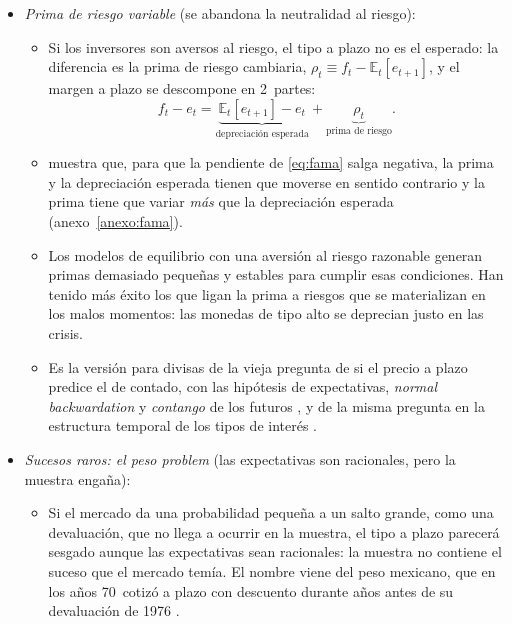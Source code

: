 \documentclass[11pt]{article}
\begin{document}
\begin{itemize}
\item \emph{Prima de riesgo variable} (se abandona la neutralidad al riesgo):
  \begin{itemize}
  \item Si los inversores son aversos al riesgo, el tipo a plazo no es el esperado: la diferencia es la prima de riesgo cambiaria, $\rho_t\equiv f_t-\mathbb{E}_t[e_{t+1}]$, y el margen a plazo se descompone en 2~partes:
    \begin{equation}\label{eq:descomposicion-fama}
    f_t-e_t=\underbrace{\mathbb{E}_t[e_{t+1}]-e_t}_{\text{depreciación esperada}}+\underbrace{\rho_t}_{\text{prima de riesgo}} .
    \end{equation}
  \item \textcite{Fama1984Forward} muestra que, para que la pendiente de \eqref{eq:fama} salga negativa, la prima y la depreciación esperada tienen que moverse en sentido contrario y la prima tiene que variar \emph{más} que la depreciación esperada (anexo~\ref{anexo:fama}).
  \item Los modelos de equilibrio con una aversión al riesgo razonable generan primas demasiado pequeñas y estables para cumplir esas condiciones\nocite{Engel1996Forward}. Han tenido más éxito los que ligan la prima a riesgos que se materializan en los malos momentos: las monedas de tipo alto se deprecian justo en las crisis\nocite{LustigVerdelhan2007Cross,BrunnermeierNagelPedersen2008Carry}.
  \item Es la versión para divisas de la vieja pregunta de si el precio a plazo predice el de contado, con las hipótesis de expectativas, \emph{normal backwardation} y \emph{contango} de los futuros , y de la misma pregunta en la estructura temporal de los tipos de interés .
  \end{itemize}
\item \emph{Sucesos raros: el \emph{peso problem}} (las expectativas son racionales, pero la muestra engaña):
  \begin{itemize}
  \item Si el mercado da una probabilidad pequeña a un salto grande, como una devaluación, que no llega a ocurrir en la muestra, el tipo a plazo parecerá sesgado aunque las expectativas sean racionales: la muestra no contiene el suceso que el mercado temía\nocite{Krasker1980Peso}. El nombre viene del peso mexicano, que en los años 70~cotizó a plazo con descuento durante años antes de su devaluación de 1976 .

\end{itemize}
\end{itemize}
\end{document}
